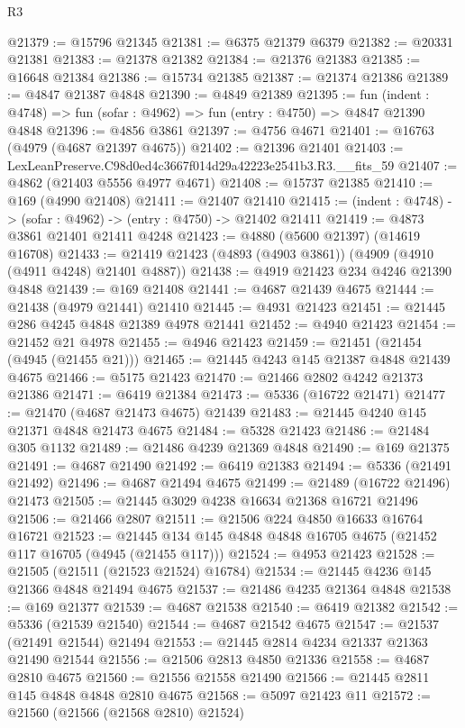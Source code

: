 \begin{lexlean}{R3}
\begin{coremodule}
@21379 := @15796 @21345
@21381 := @6375 @21379 @6379
@21382 := @20331 @21381
@21383 := @21378 @21382
@21384 := @21376 @21383
@21385 := @16648 @21384
@21386 := @15734 @21385
@21387 := @21374 @21386
@21389 := @4847 @21387 @4848
@21390 := @4849 @21389
@21395 := fun (indent : @4748) => fun (sofar : @4962) => fun (entry : @4750) => @4847 @21390 @4848
@21396 := @4856 @3861
@21397 := @4756 @4671
@21401 := @16763 (@4979 (@4687 @21397 @4675))
@21402 := @21396 @21401
@21403 := LexLeanPreserve.C98d0ed4c3667f014d29a42223e2541b3.R3.__fits_59
@21407 := @4862 (@21403 @5556 @4977 @4671)
@21408 := @15737 @21385
@21410 := @169 (@4990 @21408)
@21411 := @21407 @21410
@21415 := (indent : @4748) -> (sofar : @4962) -> (entry : @4750) -> @21402 @21411
@21419 := @4873 @3861 @21401 @21411 @4248
@21423 := @4880 (@5600 @21397) (@14619 @16708)
@21433 := @21419 @21423 (@4893 (@4903 @3861)) (@4909 (@4910 (@4911 @4248) @21401 @4887))
@21438 := @4919 @21423 @234 @4246 @21390 @4848
@21439 := @169 @21408
@21441 := @4687 @21439 @4675
@21444 := @21438 (@4979 @21441) @21410
@21445 := @4931 @21423
@21451 := @21445 @286 @4245 @4848 @21389 @4978 @21441
@21452 := @4940 @21423
@21454 := @21452 @21 @4978
@21455 := @4946 @21423
@21459 := @21451 (@21454 (@4945 (@21455 @21)))
@21465 := @21445 @4243 @145 @21387 @4848 @21439 @4675
@21466 := @5175 @21423
@21470 := @21466 @2802 @4242 @21373 @21386
@21471 := @6419 @21384
@21473 := @5336 (@16722 @21471)
@21477 := @21470 (@4687 @21473 @4675) @21439
@21483 := @21445 @4240 @145 @21371 @4848 @21473 @4675
@21484 := @5328 @21423
@21486 := @21484 @305 @1132
@21489 := @21486 @4239 @21369 @4848
@21490 := @169 @21375
@21491 := @4687 @21490
@21492 := @6419 @21383
@21494 := @5336 (@21491 @21492)
@21496 := @4687 @21494 @4675
@21499 := @21489 (@16722 @21496) @21473
@21505 := @21445 @3029 @4238 @16634 @21368 @16721 @21496
@21506 := @21466 @2807
@21511 := @21506 @224 @4850 @16633 @16764 @16721
@21523 := @21445 @134 @145 @4848 @4848 @16705 @4675 (@21452 @117 @16705 (@4945 (@21455 @117)))
@21524 := @4953 @21423
@21528 := @21505 (@21511 (@21523 @21524) @16784)
@21534 := @21445 @4236 @145 @21366 @4848 @21494 @4675
@21537 := @21486 @4235 @21364 @4848
@21538 := @169 @21377
@21539 := @4687 @21538
@21540 := @6419 @21382
@21542 := @5336 (@21539 @21540)
@21544 := @4687 @21542 @4675
@21547 := @21537 (@21491 @21544) @21494
@21553 := @21445 @2814 @4234 @21337 @21363 @21490 @21544
@21556 := @21506 @2813 @4850 @21336
@21558 := @4687 @2810 @4675
@21560 := @21556 @21558 @21490
@21566 := @21445 @2811 @145 @4848 @4848 @2810 @4675
@21568 := @5097 @21423 @11
@21572 := @21560 (@21566 (@21568 @2810) @21524)

\end{coremodule}
\end{lexlean}
